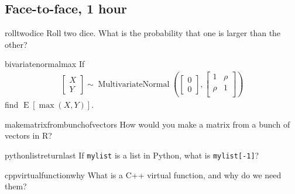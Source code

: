 \documentclass[a4paper]{article}
\begin{document}
\subsection{Face-to-face, 1 hour}

\begin{question}{rolltwodice}
Roll two dice. What is the probability that one is larger than the other?
\end{question}

\begin{question}{bivariatenormalmax}
If
\begin{align*}
  \begin{bmatrix}
  X \\ Y
  \end{bmatrix}
  \sim
  \operatorname{MultivariateNormal}
  \left(
  \begin{bmatrix}
  0 \\ 0
  \end{bmatrix}
  ,
  \begin{bmatrix}
  1      &   \rho \\
  \rho   &   1    \\
  \end{bmatrix}
  \right)
\end{align*}
find $\operatorname{E}[\max(X,Y)]$.
\end{question}

\begin{question}{makematrixfrombunchofvectors}
How would you make a matrix from a bunch of vectors in R?
\end{question}

\begin{question}{pythonlistreturnlast}
If \verb+mylist+ is a list in Python, what is \verb+mylist[-1]+?
\end{question}

\begin{question}{cppvirtualfunctionwhy}
What is a C++ virtual function, and why do we need them?
\end{question}

\clearpage





\end{document}
